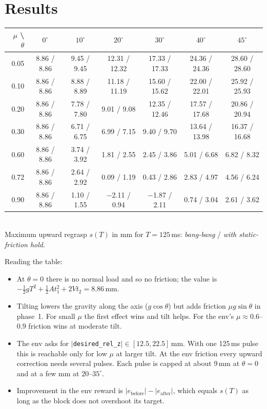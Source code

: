\documentclass[11pt,a4paper]{article}
\newcommand{\code}[1]{\texttt{#1}}
\begin{document}
\section{Results}
\begin{center}
\small
\begin{tabular}{r|cccccc}
\toprule
$\mu$ \textbackslash{} $\theta$ & $0^\circ$ & $10^\circ$ & $20^\circ$ & $30^\circ$ & $40^\circ$ & $45^\circ$\\
\midrule
0.05 & 8.86 / 8.86 & 9.45 / 9.45 & 12.31 / 12.32 & 17.33 / 17.33 & 24.36 / 24.36 & 28.60 / 28.60\\
0.10 & 8.86 / 8.86 & 8.88 / 8.89 & 11.18 / 11.19 & 15.60 / 15.62 & 22.00 / 22.01 & 25.92 / 25.93\\
0.20 & 8.86 / 8.86 & 7.78 / 7.80 & 9.01 / 9.08 & 12.35 / 12.46 & 17.57 / 17.68 & 20.86 / 20.94\\
0.30 & 8.86 / 8.86 & 6.71 / 6.75 & 6.99 / 7.15 & 9.40 / 9.70 & 13.64 / 13.98 & 16.37 / 16.68\\
\midrule
0.60 & 8.86 / 8.86 & 3.74 / 3.92 & 1.81 / 2.55 & 2.45 / 3.86 & 5.01 / 6.68 & 6.82 / 8.32\\
0.72 & 8.86 / 8.86 & 2.64 / 2.92 & 0.09 / 1.19 & 0.43 / 2.86 & 2.83 / 4.97 & 4.56 / 6.24\\
0.90 & 8.86 / 8.86 & 1.10 / 1.55 & $-$2.11 / 0.94 & $-$1.87 / 2.11 & 0.74 / 3.04 & 2.61 / 3.62\\
\bottomrule
\end{tabular}\\[3pt]
Maximum upward regrasp $s(T)$ in mm for $T=125$\,ms: \emph{bang-bang} / \emph{with static-friction hold}.
\end{center}

\noindent Reading the table:
\begin{itemize}
  \item At $\theta=0$ there is no normal load and so no friction; the value is $-\tfrac12 gT^2+\tfrac12At_1^2+2V t_2=8.86$\,mm.
  \item Tilting lowers the gravity along the axis ($g\cos\theta$) but adds friction $\mu g\sin\theta$ in phase~1. For small
        $\mu$ the first effect wins and tilt helps. For the env's $\mu\approx0.6$--$0.9$ friction wins at moderate tilt.
  \item The env asks for $|$\code{desired\_rel\_z}$|\in[12.5,22.5]$\,mm. With one 125\,ms pulse this is reachable only
        for low $\mu$ at larger tilt. At the env friction every upward correction needs several pulses. Each pulse is
        capped at about 9\,mm at $\theta=0$ and at a few mm at $20$--$35^\circ$.
  \item Improvement in the env reward is $|e_{\text{before}}|-|e_{\text{after}}|$, which equals $s(T)$ as long as the
        block does not overshoot its target.
\end{itemize}
\end{document}
